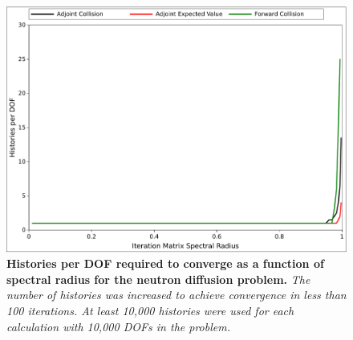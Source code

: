 \begin{figure}[t!]
  \begin{center}
    \includegraphics[width=5.75in]{chapters/spn_equations/breakdown_histories.pdf}
  \end{center}
  \caption{\textbf{Histories per DOF required to converge as a
      function of spectral radius for the neutron diffusion problem.}
    \textit{The number of histories was increased to achieve
      convergence in less than 100 iterations. At least 10,000
      histories were used for each calculation with 10,000 DOFs in the
      problem.}}
  \label{fig:breakdown_histories}
\end{figure}

